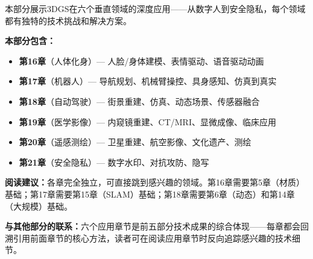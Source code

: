 \vspace{1em}
\begin{center}
\textcolor{techgray}{\small 本部分展示3DGS在六个垂直领域的深度应用——从数字人到安全隐私，每个领域都有独特的技术挑战和解决方案。}
\end{center}
\vspace{0.5em}

\noindent\textbf{本部分包含：}
\begin{itemize}[leftmargin=2em,itemsep=1pt]
\item[\textcolor{techgreen}{\textbullet}] \textbf{第16章}（人体化身）— 人脸/身体建模、表情驱动、语音驱动动画
\item[\textcolor{techgreen}{\textbullet}] \textbf{第17章}（机器人）— 导航规划、机械臂操控、具身感知、仿真到真实
\item[\textcolor{techgreen}{\textbullet}] \textbf{第18章}（自动驾驶）— 街景重建、仿真、动态场景、传感器融合
\item[\textcolor{techgreen}{\textbullet}] \textbf{第19章}（医学影像）— 内窥镜重建、CT/MRI、显微成像、临床应用
\item[\textcolor{techgreen}{\textbullet}] \textbf{第20章}（遥感测绘）— 卫星重建、航空影像、文化遗产、测绘
\item[\textcolor{techgreen}{\textbullet}] \textbf{第21章}（安全隐私）— 数字水印、对抗攻防、隐写
\end{itemize}

\noindent\textbf{阅读建议：}各章完全独立，可直接跳到感兴趣的领域。第16章需要第5章（材质）基础；第17章需要第15章（SLAM）基础；第18章需要第6章（动态）和第14章（大规模）基础。

\noindent\textbf{与其他部分的联系：}六个应用章节是前五部分技术成果的综合体现——每章都会回溯引用前面章节的核心方法，读者可在阅读应用章节时反向追踪感兴趣的技术细节。

\vspace{1em}

